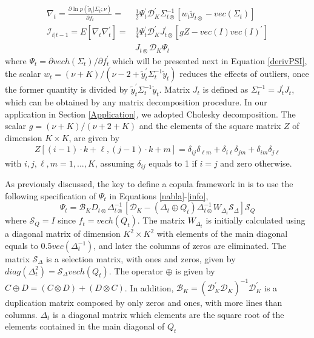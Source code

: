 \documentclass[a4paper]{IEEEtran}
\begin{document}
\begin{align} 
\nabla_{t} = \frac{\partial \ln p(\tilde{y}_{t}|\Sigma_{t};\nu)}{\partial f_{t}} =& \frac{1}{2} \Psi_{t}^{'} \mathcal{D}_{K}^{'}\Sigma_{t\otimes}^{-1}[w_{t}\tilde{y}_{t\otimes}-vec(\Sigma_{t})] \label{nabla} \\
\mathcal{I}_{t|t-1} = E[\nabla_{t}\nabla_{t}^{'}] =& \frac{1}{4} \Psi_{t}^{'} \mathcal{D}_{K}^{'}J_{t\otimes}^{'}[gZ-vec(I)vec(I)^{'}] \label{info} \\ & J_{t\otimes}\mathcal{D}_{K}\Psi_{t} \nonumber
\end{align}
\noindent
where $\Psi_{t}=\partial vech(\Sigma_{t})/\partial f_{t}^{'}$ which will be presented next in Equation \eqref{derivPSI}, the scalar $w_{t}=(\nu+K)/(\nu-2+\tilde{y}_{t}^{'}\Sigma_{t}^{-1}\tilde{y}_{t})$ reduces the effects of outliers, once the former quantity is divided by $\tilde{y}_{t}^{'}\Sigma_{t}^{-1}\tilde{y}_{t}$. Matrix $J_{t}$ is defined as $\Sigma^{-1}_{t}=J^{'}_{t}J_{t}$, which can be obtained by any matrix decomposition procedure. In our application in Section \ref{Application}, we adopted Cholesky decomposition. The scalar $g=(\nu+K)/(\nu+2+K)$ and the elements of the square matrix $Z$ of dimension $K\times K$, are given by
\begin{align} 
Z[(i-1)\cdot k+\ell,(j-1)\cdot k+m]=\delta_{ij}\delta_{\ell m} + \delta_{i\ell}\delta_{j m} +  \delta_{im}\delta_{j \ell}
\end{align}
\noindent
with $i,j,\ell,m=1,...,K$, assuming $\delta_{ij}$ equals to 1 if $i=j$ and zero otherwise. 

As previously discussed, the key to define a copula framework in \cite{creal2011dynamic} is to use the following specification of $\Psi_{t}$ in Equations \eqref{nabla}-\eqref{info},
\begin{equation} \label{derivPSI}
\Psi_{t} = \mathcal{B}_{K}D_{t\otimes}\Delta^{-1}_{t\otimes}[\mathcal{D}_{K}-(\Delta_{t} \oplus Q_{t})\Delta_{t\otimes}^{-1}W_{\Delta_{t}}\mathcal{S}_{\Delta}]\mathcal{S}_{Q}
\end{equation}
\noindent
where $\mathcal{S}_{Q}=I$ since $f_{t}=vech(Q_{t})$. The matrix $W_{\Delta_{t}}$ is initially calculated using a diagonal matrix of dimension $K^{2} \times K^{2}$ with elements of the main diagonal equals to $0.5vec(\Delta^{-1}_{t})$, and later the columns of zeros are eliminated. The matrix $\mathcal{S}_{\Delta}$ is a selection matrix, with ones and zeros, given by $diag(\Delta^{2}_{t})=\mathcal{S}_{\Delta}vech(Q_{t})$. The operator $\oplus$ is given by $C\oplus D=(C\otimes D)+(D\otimes C)$. In addition, $\mathcal{B}_{K}=(\mathcal{D}_{K}^{'}\mathcal{D}_{K})^{-1}\mathcal{D}_{K}^{'}$ is a duplication matrix composed by only zeros and ones, with more lines than columns. $\Delta_{t}$ is a diagonal matrix which elements are the square root of the elements contained in the main diagonal of $Q_{t}$
\end{document}
